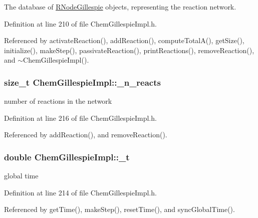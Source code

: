 The database of \hyperlink{classRNodeGillespie}{R\+Node\+Gillespie} objects, representing the reaction network. 



Definition at line 210 of file Chem\+Gillespie\+Impl.\+h.



Referenced by activate\+Reaction(), add\+Reaction(), compute\+Total\+A(), get\+Size(), initialize(), make\+Step(), passivate\+Reaction(), print\+Reactions(), remove\+Reaction(), and $\sim$\+Chem\+Gillespie\+Impl().

\hypertarget{classChemGillespieImpl_ae66f4f44055f9af574bd334f78f92393}{
\subsubsection[{\+\_\+n\+\_\+reacts}]{\setlength{\rightskip}{0pt plus 5cm}size\+\_\+t Chem\+Gillespie\+Impl\+::\+\_\+n\+\_\+reacts\hspace{0.3cm}{\ttfamily [private]}}}\label{classChemGillespieImpl_ae66f4f44055f9af574bd334f78f92393}


number of reactions in the network 



Definition at line 216 of file Chem\+Gillespie\+Impl.\+h.



Referenced by add\+Reaction(), and remove\+Reaction().

\hypertarget{classChemGillespieImpl_ab709229380a7bd5458d6c4b382036a7a}{
\subsubsection[{\+\_\+t}]{\setlength{\rightskip}{0pt plus 5cm}double Chem\+Gillespie\+Impl\+::\+\_\+t\hspace{0.3cm}{\ttfamily [private]}}}\label{classChemGillespieImpl_ab709229380a7bd5458d6c4b382036a7a}


global time 



Definition at line 214 of file Chem\+Gillespie\+Impl.\+h.



Referenced by get\+Time(), make\+Step(), reset\+Time(), and sync\+Global\+Time().

